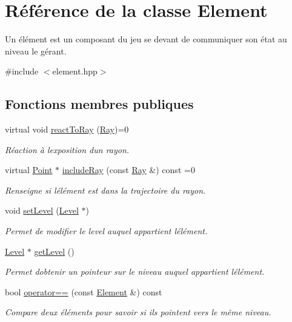 \hypertarget{classElement}{}\section{Référence de la classe Element}
\label{classElement}


Un élément est un composant du jeu se devant de communiquer son état au niveau le gérant.  




{\ttfamily \#include $<$element.\+hpp$>$}

\subsection*{Fonctions membres publiques}
\begin{DoxyCompactItemize}
\item 
virtual void \hyperlink{classElement_aa87116bb9422d64169b2ebf03831df9b}{react\+To\+Ray} (\hyperlink{classRay}{Ray})=0
\begin{DoxyCompactList}\small\item\em Réaction à l\textquotesingle{}exposition d\textquotesingle{}un rayon. \end{DoxyCompactList}\item 
virtual \hyperlink{classPoint}{Point} $\ast$ \hyperlink{classElement_a1b88519623a6250155f7182706665448}{include\+Ray} (const \hyperlink{classRay}{Ray} \&) const  =0
\begin{DoxyCompactList}\small\item\em Renseigne si l\textquotesingle{}élément est dans la trajectoire du rayon. \end{DoxyCompactList}\item 
void \hyperlink{classElement_a52d67b5af9d0e96092b7cd4c3058d17b}{set\+Level} (\hyperlink{classLevel}{Level} $\ast$)
\begin{DoxyCompactList}\small\item\em Permet de modifier le level auquel appartient l\textquotesingle{}élément. \end{DoxyCompactList}\item 
\hyperlink{classLevel}{Level} $\ast$ \hyperlink{classElement_aea3bbf40d27afdf61833f59775e488f3}{get\+Level} ()
\begin{DoxyCompactList}\small\item\em Permet d\textquotesingle{}obtenir un pointeur sur le niveau auquel appartient l\textquotesingle{}élément. \end{DoxyCompactList}\item 
bool \hyperlink{classElement_aa8ab9ae8d680e81c964f0eaee2dfb44d}{operator==} (const \hyperlink{classElement}{Element} \&) const 
\begin{DoxyCompactList}\small\item\em Compare deux éléments pour savoir si ils pointent vers le même niveau. \end{DoxyCompactList}\end{DoxyCompactItemize}
